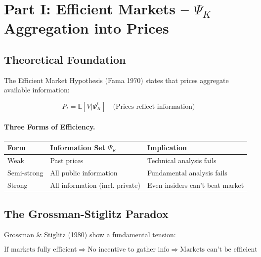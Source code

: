 \section{Part I: Efficient Markets -- $\Psi_K$ Aggregation into Prices}
\label{sec:Y-efficient-markets}

\subsection{Theoretical Foundation}

The Efficient Market Hypothesis (Fama 1970) states that prices aggregate
available information:

\begin{equation}
\boxed{
P_t = \mathbb{E}[V | \Psi_K^t] \quad \text{(Prices reflect information)}
}
\label{eq:emh}
\end{equation}

\paragraph{Three Forms of Efficiency.}
\begin{center}
\renewcommand{\arraystretch}{1.3}
\begin{tabular}{|l|l|l|}
\hline
\textbf{Form} & \textbf{Information Set $\Psi_K$} & \textbf{Implication} \\
\hline
Weak & Past prices & Technical analysis fails \\
Semi-strong & All public information & Fundamental analysis fails \\
Strong & All information (incl. private) & Even insiders can't beat market \\
\hline
\end{tabular}
\end{center}

\subsection{The Grossman-Stiglitz Paradox}

Grossman \& Stiglitz (1980) show a fundamental tension:

\begin{equation}
\boxed{
\text{If markets fully efficient} \Rightarrow \text{No incentive to gather info}
\Rightarrow \text{Markets can't be efficient}
}
\label{eq:gs-paradox}
\end{equation}


